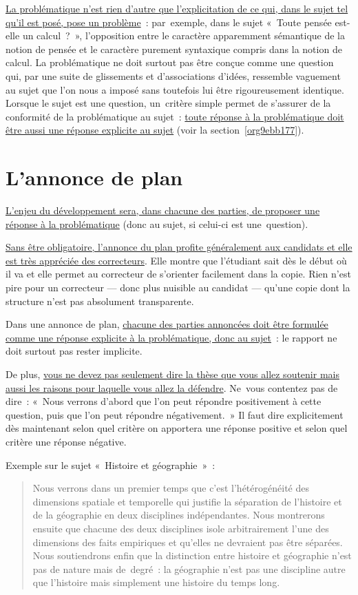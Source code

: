 \documentclass[a4paper,12pt]{report}
\begin{document}
\uline{La problématique n'est rien d'autre que l'explicitation de ce qui, dans
le sujet tel qu'il est posé, pose un problème} : par exemple, dans le
sujet « Toute pensée est-elle un calcul ? », l'opposition entre le
caractère apparemment sémantique de la notion de pensée et le caractère
purement syntaxique compris dans la notion de calcul. La problématique
ne doit surtout pas être conçue comme une question qui, par une suite de
glissements et d'associations d'idées, ressemble vaguement au sujet que
l'on nous a imposé sans toutefois lui être rigoureusement identique.
Lorsque le sujet est une question, un critère simple permet de s'assurer
de la conformité de la problématique au sujet : \uline{toute réponse à la
problématique doit être aussi une réponse explicite au sujet} (voir la
section \ref{org9ebb177}).



\section{L'annonce de plan}
\label{sec:orgcb1dfb9}
\label{org27137cf}

\uline{L'enjeu du développement sera, dans chacune des parties, de proposer
une réponse à la problématique} (donc au sujet, si celui-ci est
une question).

\uline{Sans être obligatoire, l'annonce du plan profite généralement aux
candidats et elle est très appréciée des correcteurs}. Elle montre que
l'étudiant sait dès le début où il va et elle permet au correcteur de
s'orienter facilement dans la copie. Rien n'est pire pour un correcteur
— donc plus nuisible au candidat — qu'une copie dont la structure n'est
pas absolument transparente.

Dans une annonce de plan, \uline{chacune des parties annoncées doit être
formulée comme une réponse explicite à la problématique, donc au
sujet} : le rapport ne doit surtout pas rester implicite.

De plus, \uline{vous ne devez pas seulement dire la thèse que vous allez
soutenir mais aussi les raisons pour laquelle vous allez la défendre}.
Ne vous contentez pas de dire : « Nous verrons d'abord que l'on peut
répondre positivement à cette question, puis que l'on peut répondre
négativement. » Il faut dire explicitement dès maintenant selon quel
critère on apportera une réponse positive et selon quel critère une
réponse négative.

Exemple sur le sujet « Histoire et géographie » :
\begin{quotation}
Nous verrons dans un premier temps que c'est l'hétérogénéité des
dimensions spatiale et temporelle qui justifie la séparation de
l'histoire et de la géographie en deux disciplines indépendantes. Nous
montrerons ensuite que chacune des deux disciplines isole arbitrairement
l'une des dimensions des faits empiriques et qu'elles ne devraient pas
être séparées. Nous soutiendrons enfin que la distinction entre histoire
et géographie n'est pas de nature mais de degré : la géographie n'est
pas une discipline autre que l'histoire mais simplement une histoire du
temps long.
\end{quotation}
\end{document}

